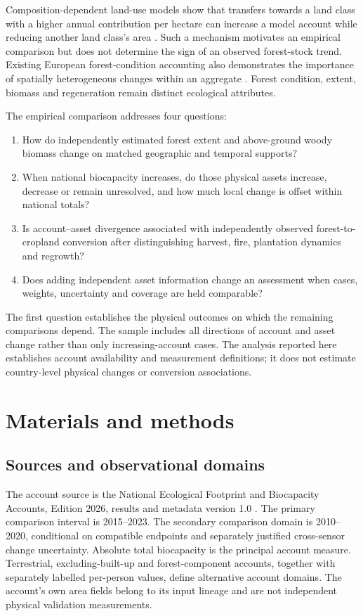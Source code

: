 \documentclass[11pt,a4paper]{article}
\begin{document}
Composition-dependent land-use models show that transfers towards a land class with a higher annual contribution per hectare can increase a model account while reducing another land class's area \citep{Abaee2026}. Such a mechanism motivates an empirical comparison but does not determine the sign of an observed forest-stock trend. Existing European forest-condition accounting also demonstrates the importance of spatially heterogeneous changes within an aggregate \citep{Maes2023}. Forest condition, extent, biomass and regeneration remain distinct ecological attributes.

The empirical comparison addresses four questions:
\begin{enumerate}
\item How do independently estimated forest extent and above-ground woody biomass change on matched geographic and temporal supports?
\item When national biocapacity increases, do those physical assets increase, decrease or remain unresolved, and how much local change is offset within national totals?
\item Is account--asset divergence associated with independently observed forest-to-cropland conversion after distinguishing harvest, fire, plantation dynamics and regrowth?
\item Does adding independent asset information change an assessment when cases, weights, uncertainty and coverage are held comparable?
\end{enumerate}
The first question establishes the physical outcomes on which the remaining comparisons depend. The sample includes all directions of account and asset change rather than only increasing-account cases. The analysis reported here establishes account availability and measurement definitions; it does not estimate country-level physical changes or conversion associations.

\section{Materials and methods}
\subsection{Sources and observational domains}
The account source is the National Ecological Footprint and Biocapacity Accounts, Edition 2026, results and metadata version 1.0 \citep{Lo2026}. The primary comparison interval is 2015--2023. The secondary comparison domain is 2010--2020, conditional on compatible endpoints and separately justified cross-sensor change uncertainty. Absolute total biocapacity is the principal account measure. Terrestrial, excluding-built-up and forest-component accounts, together with separately labelled per-person values, define alternative account domains. The account's own area fields belong to its input lineage and are not independent physical validation measurements.
\end{document}
